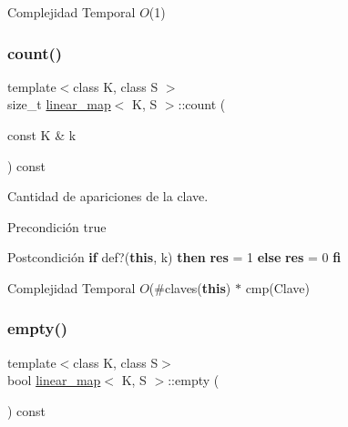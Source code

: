 \begin{DoxyDescription}
\item[Complejidad Temporal]$O$(1)
\end{DoxyDescription}\mbox{\label{classlinear__map_ac906ffa073c059c8ea5897b79c92c6f4}} 
\subsubsection{\texorpdfstring{count()}{count()}}
{\footnotesize\ttfamily template$<$class K, class S $>$ \\
size\+\_\+t \mbox{\hyperlink{classlinear__map}{linear\+\_\+map}}$<$ K, S $>$\+::count (\begin{DoxyParamCaption}\item[{const K \&}]{k }\end{DoxyParamCaption}) const}



Cantidad de apariciones de la clave. 

\begin{DoxyPrecond}{Precondición}
true 
\end{DoxyPrecond}
\begin{DoxyPostcond}{Postcondición}
{\bfseries if} def?({\bfseries this}, k) {\bfseries then} {\bfseries res} = 1 {\bfseries else} {\bfseries res} = 0 {\bfseries fi} 
\end{DoxyPostcond}

\begin{DoxyDescription}
\item[Complejidad Temporal]$O$(\#claves({\bfseries this}) $\ast$ cmp(\+Clave)
\end{DoxyDescription}\mbox{\label{classlinear__map_af6a78e9c9189a3ab81d2aaa8a187c754}} 
\subsubsection{\texorpdfstring{empty()}{empty()}}
{\footnotesize\ttfamily template$<$class K, class S$>$ \\
bool \mbox{\hyperlink{classlinear__map}{linear\+\_\+map}}$<$ K, S $>$\+::empty (\begin{DoxyParamCaption}{ }\end{DoxyParamCaption}) const\hspace{0.3cm}{\ttfamily [inline]}}



